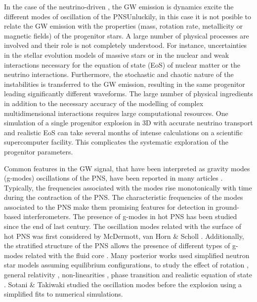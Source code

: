In the case of the neutrino-driven , the GW emission is  dynamics excite the different modes of oscillation of the PNSUnluckily, in this case it is not posible to relate the GW emission with the properties (mass, rotation rate, metallicity or magnetic fields) of the progenitor stars.  A large number of physical processes are involved and their role is not completely understood. For instance,  uncertainties in the stellar evolution models of massive stars or in the nuclear and weak interactions necessary for the equation of state (EoS) of nuclear matter or the neutrino interactions. Furthermore, the stochastic and chaotic nature of the instabilities is transferred to the GW emission, resulting in the same progenitor leading significantly different waveforms.
The large number of physical ingredients in addition to the necessary accuracy of the modelling of complex multidimensional interactions requires large computational resources. One simulation of a single progenitor explosion  in 3D with accurate neutrino transport and realistic EoS can take several months of intense calculations on a scientific supercomputer facility. This complicates the systematic exploration of the progenitor parameters.

Common features in the GW signal, that have been interpreted as gravity modes (g-modes) oscillations of the PNS, have been reported in many articles \cite{murphy:09, Cerda:2013, mueller:13gw, Yakunin:2015, Kuroda:2016, Andresen:2017}. Typically, the frequencies associated with the modes rise monotonically with time during the contraction of the PNS. The characteristic frequencies of the modes associated to the PNS make them promising features for detection in ground-based interferometers. The presence of g-modes in hot PNS has been studied since the end of last century. The oscillation modes related with the surface of hot PNS was first considered by McDermott, van Horn \& Scholl \cite{McDermott:1983}. Additionally, the stratified structure of the PNS allows the presence of different types of g-modes related with the fluid core \cite{Reisenegger:1992}. Many posterior works used simplified neutron star models  assuming equilibrium configurations, to study the effect of rotation \cite{Ferrari:2004}, general relativity \cite{Passamonti:2005}, non-linearities \cite{Dimmelmeier:2006}, phase transition \cite{Kruger:2015} and realistic equation of state \cite{Camelio:2017}. Sotani \& Takiwaki \cite{Sotani:2016} studied the oscillation modes before the explosion using a simplified fits to numerical simulations.

